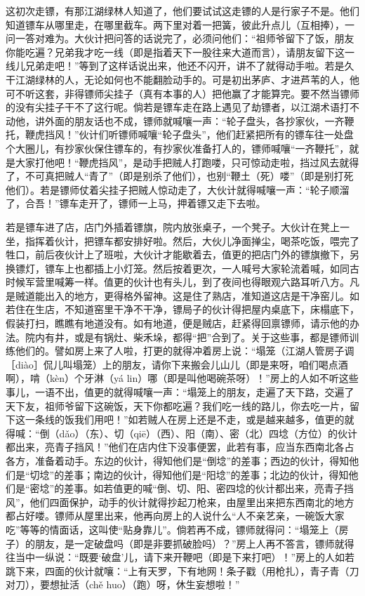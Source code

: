 \documentclass[12pt,UTF8]{ctexbook}
\begin{document}
这初次走镖，有那江湖绿林人知道了，他们要试试这走镖的人是行家子不是。他们知道镖车从哪里走，在哪里截车。两下里对着一把簧，彼此升点儿（互相捧），一问一答对难为。大伙计把问答的话说完了，必须问他们：“祖师爷留下了饭，朋友你能吃遍？兄弟我才吃一线（即是指着天下一股往来大道而言），请朋友留下这一线儿兄弟走吧！”等到了这样话说出来，他还不闪开，讲不了就得动手啦。若是久干江湖绿林的人，无论如何也不能翻脸动手的。可是初出茅庐、才进芦苇的人，他可不听这套，非得镖师尖挂子（真有本事的人）把他赢了才能算完。要不然当镖师的没有尖挂子干不了这行呢。倘若是镖车走在路上遇见了劫镖者，以江湖术语打不动他，讲外面的朋友话也不成，镖师就喊嚷一声：“轮子盘头，各抄家伙，一齐鞭托，鞭虎挡风！”伙计们听镖师喊嚷“轮子盘头”，他们赶紧把所有的镖车往一处盘个大圈儿，有抄家伙保住镖车的，有抄家伙准备打人的，镖师喊嚷“一齐鞭托”，就是大家打他吧！“鞭虎挡风”，是动手把贼人打跑喽，只可惊动走啦，挡过风去就得了，不可真把贼人“青了”（即是别杀了他们），也别“鞭土（死）喽”（即是别打死他们）。若是镖师仗着尖挂子把贼人惊动走了，大伙计就得喊嚷一声：“轮子顺溜了，合吾！”镖车走开了，镖师一上马，押着镖又走下去啦。

若是镖车进了店，店门外插着镖旗，院内放张桌子，一个凳子。大伙计在凳上一坐，指挥着伙计，把镖车都安排好啦。然后，大伙儿净面掸尘，喝茶吃饭，喂完了牲口，前后夜伙计上了班啦，大伙计才能歇着去，值更的把店门外的镖旗撤下，另换镖灯，镖车上也都插上小灯笼。然后按着更次，一人喊号大家轮流着喊，如同古时候军营里喊筹一样。值更的伙计也有头儿，到了夜间也得眼观六路耳听八方。凡是贼道能出入的地方，更得格外留神。这是住了熟店，准知道这店是干净窑儿。如若住在生店，不知道窑里干净不干净，镖局子的伙计得把屋内桌底下，床榻底下，假装打扫，瞧瞧有地道没有。如有地道，便是贼店，赶紧得回禀镖师，请示他的办法。院内有井，或是有锅灶、柴禾垛，都得“把”合到了。关于这些事，都是镖师训练他们的。譬如房上来了人啦，打更的就得冲着房上说：“塌笼（江湖人管房子调［diào］侃儿叫塌笼）上的朋友，请你下来搬会儿山儿（即是来呀，咱们喝点酒啊），啃（kèn）个牙淋（yá lin）哪（即是叫他喝碗茶呀）！”房上的人如不听这些事儿，一语不出，值更的就得喊嚷一声：“塌笼上的朋友，走遍了天下路，交遍了天下友，祖师爷留下这碗饭，天下你都吃遍？我们吃一线的路儿，你去吃一片，留下这一条线的饭我们用吧！”如若贼人在房上还是不走，或是越来越多，值更的就得喊：“倒（dǎo）（东）、切（qiē）（西）、阳（南）、密（北）四埝（方位）的伙计都出来，亮青子挡风！”他们在店内住下没事便罢，此若有事，应当东西南北各占各方，准备着动手。东边的伙计，得知他们是“倒埝”的差事；西边的伙计，得知他们是“切埝”的差事；南边的伙计，得知他们是“阳埝”的差事；北边的伙计，得知他们是“密埝”的差事。如若值更的喊“倒、切、阳、密四埝的伙计都出来，亮青子挡风”，他们四面保护，动手的伙计就得抄起刀枪来，由屋里出来把东西南北的地方都占好喽。镖师从屋里出来，他再向房上的人说什么“人不亲艺亲，一碗饭大家吃”等等的情面话，这叫使“贴身靠儿”。倘若再不成，镖师就得问：“塌笼上（房子）的朋友，是一定破盘吗（即是非要抓破脸吗）？”房上人再不答言，镖师就得往当中一纵说：“既要‘破盘’儿，请下来开鞭吧（即是下来打吧）！”房上的人如若跳下来，四面的伙计就嚷：“上有天罗，下有地网！条子戳（用枪扎），青子青（刀对刀），要想扯活（chě huo）（跑）呀，休生妄想啦！”
\end{document}
